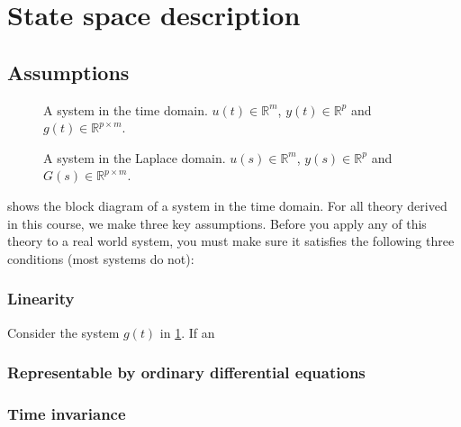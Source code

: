 \documentclass[a4paper,12pt]{article}
\begin{document}
\section{State space description}
\subsection{Assumptions}
\begin{figure}[H]
  \centering
  \caption{A system in the time domain. $u(t) \in \mathbb{R}^m$, $y(t) \in \mathbb{R}^p$ and $g(t) \in \mathbb{R}^{p \times m}$.}
  \label{fig:simpleSystemTime}
\end{figure}

\begin{figure}[H]
  \centering
  \caption{A system in the Laplace domain. $u(s) \in \mathbb{R}^m$, $y(s) \in \mathbb{R}^p$ and $G(s) \in \mathbb{R}^{p \times m}$.}
  \label{fig:simpleSystemLaplace}
\end{figure}
 shows the block diagram of a system in the time domain. For all theory derived in this course, we make three key assumptions. Before you apply any of this theory to a real world system, you must make sure it satisfies the following three conditions (most systems do not):
\subsubsection{Linearity}
Consider the system $g(t)$ in \cref{fig:simpleSystemTime}. If an
\subsubsection{Representable by ordinary differential equations}

\subsubsection{Time invariance}
\end{document}
